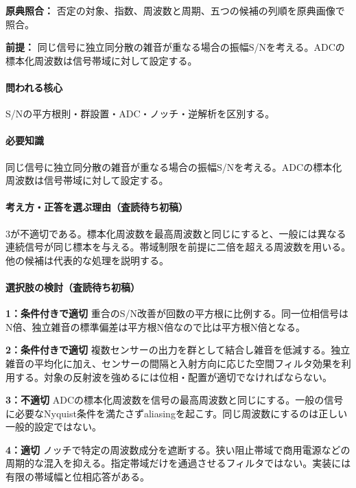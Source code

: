 \noindent\textbf{原典照合：} 否定の対象、指数、周波数と周期、五つの候補の列順を原典画像で照合。\par

\noindent\textbf{前提：} 同じ信号に独立同分散の雑音が重なる場合の振幅S/Nを考える。ADCの標本化周波数は信号帯域に対して設定する。\par

\paragraph{問われる核心} S/Nの平方根則・群設置・ADC・ノッチ・逆解析を区別する。

\paragraph{必要知識} 同じ信号に独立同分散の雑音が重なる場合の振幅S/Nを考える。ADCの標本化周波数は信号帯域に対して設定する。

\paragraph{考え方・正答を選ぶ理由（査読待ち初稿）} 3が不適切である。標本化周波数を最高周波数と同じにすると、一般には異なる連続信号が同じ標本を与える。帯域制限を前提に二倍を超える周波数を用いる。他の候補は代表的な処理を説明する。

\paragraph{選択肢の検討（査読待ち初稿）}\mbox{}\par

\noindent\textbf{1：条件付きで適切} 重合のS/N改善が回数の平方根に比例する。同一位相信号はN倍、独立雑音の標準偏差は平方根N倍なので比は平方根N倍となる。\par

\noindent\textbf{2：条件付きで適切} 複数センサーの出力を群として結合し雑音を低減する。独立雑音の平均化に加え、センサーの間隔と入射方向に応じた空間フィルタ効果を利用する。対象の反射波を強めるには位相・配置が適切でなければならない。\par

\noindent\textbf{3：不適切} ADCの標本化周波数を信号の最高周波数と同じにする。一般の信号に必要なNyquist条件を満たさずaliasingを起こす。同じ周波数にするのは正しい一般的設定ではない。\par

\noindent\textbf{4：適切} ノッチで特定の周波数成分を遮断する。狭い阻止帯域で商用電源などの周期的な混入を抑える。指定帯域だけを通過させるフィルタではない。実装には有限の帯域幅と位相応答がある。\par

